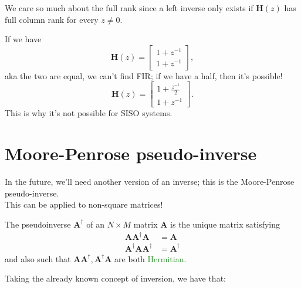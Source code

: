 \documentclass[a4paper, 12pt]{book}
\begin{document}
\begin{tcolorbox}[colback=white, colframe=obsidianBorderPurple, boxrule=1pt, rounded corners]
    \begin{tcolorbox}[colback=obsidianGreen, colframe=white, boxrule=0pt, sharp corners]
        We care so much about the full rank since a left inverse only exists if $\mathbf{H}(z)$ has full column rank for every $z \neq 0$.

        If we have
        \[ \mathbf{H}(z) = \begin{bmatrix} 1 + z^{-1} \\ 1 + z^{-1} \end{bmatrix} , \]
        aka the two are equal, we can't find FIR; if we have a half, then it's possible!
        \[ \mathbf{H}(z) = \begin{bmatrix} 1 + \frac{z^{-1}}{2} \\ 1 + z^{-1} \end{bmatrix} . \]
        This is why it's not possible for SISO systems.
    \end{tcolorbox}
\end{tcolorbox}

\section{Moore-Penrose pseudo-inverse}

In the future, we'll need another version of an inverse; this is the Moore-Penrose pseudo-inverse.\\
This can be applied to non-square matrices!

The pseudoinverse $\boldsymbol{A}^\dagger$ of an $N \times M$ matrix $\boldsymbol{A}$ is the unique matrix satisfying
\begin{align}
    \boldsymbol{A}\boldsymbol{A}^\dagger \boldsymbol{A} &= \boldsymbol{A} \tag{B.30} \\
    \boldsymbol{A}^\dagger \boldsymbol{A} \boldsymbol{A}^\dagger &= \boldsymbol{A}^\dagger \tag{B.31}
\end{align}
and also such that $\boldsymbol{A}\boldsymbol{A}^\dagger, \boldsymbol{A}^\dagger \boldsymbol{A}$ are both \textcolor{ForestGreen}{Hermitian}.

Taking the already known concept of inversion, we have that:
\end{document}
